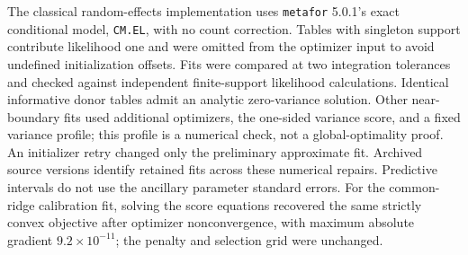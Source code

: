 \documentclass[10pt,a4paper]{article}
\begin{document}
The classical random-effects implementation uses \texttt{metafor} 5.0.1's exact conditional model, \texttt{CM.EL}, with no count correction. Tables with singleton support contribute likelihood one and were omitted from the optimizer input to avoid undefined initialization offsets. Fits were compared at two integration tolerances and checked against independent finite-support likelihood calculations. Identical informative donor tables admit an analytic zero-variance solution. Other near-boundary fits used additional optimizers, the one-sided variance score, and a fixed variance profile; this profile is a numerical check, not a global-optimality proof. An initializer retry changed only the preliminary approximate fit. Archived source versions identify retained fits across these numerical repairs. Predictive intervals do not use the ancillary parameter standard errors. For the common-ridge calibration fit, solving the score equations recovered the same strictly convex objective after optimizer nonconvergence, with maximum absolute gradient $9.2\times10^{-11}$; the penalty and selection grid were unchanged.

\small


\end{document}
